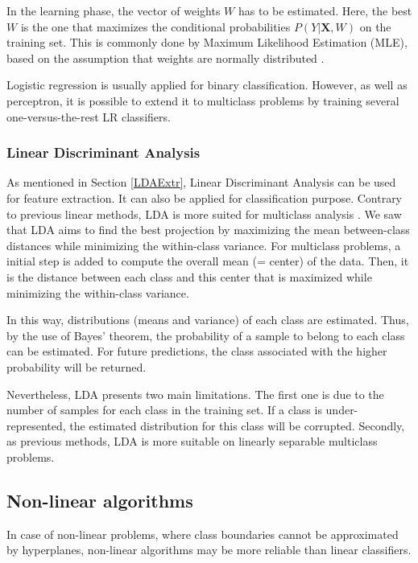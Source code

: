 \documentclass[a4paper,10pt]{article}
\begin{document}
In the learning phase, the vector of weights $W$ has to be estimated. Here, the best $W$ is the one that maximizes the conditional probabilities $P(Y|\bm{X}, W)$ on the training set. This is commonly done by Maximum Likelihood Estimation (MLE), based on the assumption that weights are normally distributed \cite{czepiel2002maximum}.

Logistic regression is usually applied for binary classification. However, as well as perceptron, it is possible to extend it to multiclass problems by training several one-versus-the-rest LR classifiers.

\subsubsection{Linear Discriminant Analysis}
\label{LDAML}

As mentioned in Section \ref{LDAExtr}, Linear Discriminant Analysis can be used for feature extraction. It can also be applied for classification purpose. Contrary to previous linear methods, LDA is more suited for multiclass analysis \cite{rao1948tests}. We saw that LDA aims to find the best projection by maximizing the mean between-class distances while minimizing the within-class variance. For multiclass problems, a initial step is added to compute the overall mean (= center) of the data. Then, it is the distance between each class and this center that is maximized while minimizing the within-class variance. 

In this way, distributions (means and variance) of each class are estimated. Thus, by the use of Bayes' theorem, the probability of a sample to belong to each class can be estimated. For future predictions, the class associated with the higher probability will be returned.

Nevertheless, LDA presents two main limitations. The first one is due to the number of samples for each class in the training set. If a class is under-represented, the estimated distribution for this class will be corrupted. Secondly, as previous methods, LDA is more suitable on linearly separable multiclass problems.

\subsection{Non-linear algorithms}

In case of non-linear problems, where class boundaries cannot be approximated by hyperplanes, non-linear algorithms may be more reliable than linear classifiers. 
\end{document}
